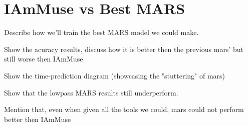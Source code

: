 \section{IAmMuse vs Best MARS}
\label{section: evaluation - iammuse vs best mars}

Describe how we'll train the best MARS model we could make.

Show the acuracy results, discuss how it is better then the previous mars' but still worse then IAmMuse

Show the time-prediction diagram (showcasing the "stuttering" of mars)

Show that the lowpass MARS results still underperform.

Mention that, even when given all the tools we could, mars could not perform better then IAmMuse

